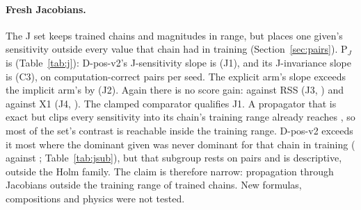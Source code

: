 \paragraph{Fresh Jacobians.}
The J set keeps trained chains and magnitudes in range, but places one given's sensitivity outside every value that
chain had in training (Section~\ref{sec:pairs}).
P$_J$ is  (Table~\ref{tab:j}): D-pos-v2's J-sensitivity slope is  (J1), and its
J-invariance slope is  (C3), on  computation-correct pairs per seed.
The explicit arm's slope exceeds the implicit arm's by  (J2).
Again there is no score gain: against RSS  (J3, ) and against X1  (J4,
).
The clamped comparator qualifies J1.
A propagator that is exact but clips every sensitivity into its chain's training range already reaches
, so most of the set's contrast is reachable inside the training range.
D-pos-v2 exceeds it most where the dominant given was never dominant for that chain in training (
against ; Table~\ref{tab:jsub}), but that subgroup rests on  pairs and is
descriptive, outside the Holm family.
The claim is therefore narrow: propagation through Jacobians outside the training range of trained chains.
New formulas, compositions and physics were not tested.

